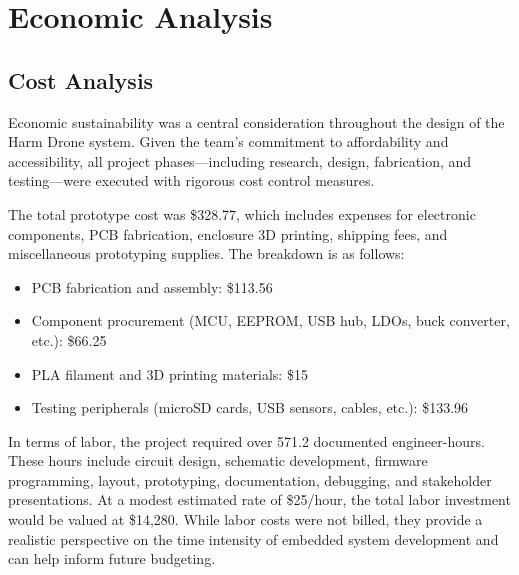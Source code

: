 \documentclass[12pt]{article}
\begin{document}
\section{Economic Analysis}

\subsection{Cost Analysis}

\par Economic sustainability was a central consideration throughout the design of the Harm Drone system. Given the team's commitment to affordability and accessibility, all project phases—including research, design, fabrication, and testing—were executed with rigorous cost control measures.

\par The total prototype cost was \$328.77, which includes expenses for electronic components, PCB fabrication, enclosure 3D printing, shipping fees, and miscellaneous prototyping supplies. The breakdown is as follows:

\begin{itemize}
\item PCB fabrication and assembly: \$113.56
\item Component procurement (MCU, EEPROM, USB hub, LDOs, buck converter, etc.): \$66.25
\item PLA filament and 3D printing materials: \$15
\item Testing peripherals (microSD cards, USB sensors, cables, etc.): \$133.96
\end{itemize}

\par In terms of labor, the project required over 571.2 documented engineer-hours. These hours include circuit design, schematic development, firmware programming, layout, prototyping, documentation, debugging, and stakeholder presentations. At a modest estimated rate of \$25/hour, the total labor investment would be valued at \$14,280. While labor costs were not billed, they provide a realistic perspective on the time intensity of embedded system development and can help inform future budgeting.
\end{document}
